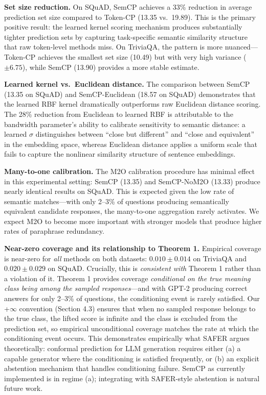 \documentclass{article}
\begin{document}
\label{sec:analysis}

\textbf{Set size reduction.} On SQuAD, SemCP achieves a 33\% reduction in average prediction set size compared to Token-CP (13.35 vs.\ 19.89). This is the primary positive result: the learned kernel scoring mechanism produces substantially tighter prediction sets by capturing task-specific semantic similarity structure that raw token-level methods miss. On TriviaQA, the pattern is more nuanced---Token-CP achieves the smallest set size (10.49) but with very high variance ($\pm 6.75$), while SemCP (13.90) provides a more stable estimate.

\textbf{Learned kernel vs.\ Euclidean distance.} The comparison between SemCP (13.35 on SQuAD) and SemCP-Euclidean (18.57 on SQuAD) demonstrates that the learned RBF kernel dramatically outperforms raw Euclidean distance scoring. The 28\% reduction from Euclidean to learned RBF is attributable to the bandwidth parameter's ability to calibrate sensitivity to semantic distance: a learned $\sigma$ distinguishes between ``close but different'' and ``close and equivalent'' in the embedding space, whereas Euclidean distance applies a uniform scale that fails to capture the nonlinear similarity structure of sentence embeddings.

\textbf{Many-to-one calibration.} The M2O calibration procedure has minimal effect in this experimental setting: SemCP (13.35) and SemCP-NoM2O (13.33) produce nearly identical results on SQuAD. This is expected given the low rate of semantic matches---with only 2--3\% of questions producing semantically equivalent candidate responses, the many-to-one aggregation rarely activates. We expect M2O to become more important with stronger models that produce higher rates of paraphrase redundancy.

\textbf{Near-zero coverage and its relationship to Theorem 1.} Empirical coverage is near-zero for \emph{all} methods on both datasets: $0.010 \pm 0.014$ on TriviaQA and $0.020 \pm 0.029$ on SQuAD. Crucially, this is \emph{consistent with} Theorem 1 rather than a violation of it. Theorem 1 provides coverage \emph{conditional on the true meaning class being among the sampled responses}---and with GPT-2 producing correct answers for only 2--3\% of questions, the conditioning event is rarely satisfied. Our +$\infty$ convention (Section 4.3) ensures that when no sampled response belongs to the true class, the lifted score is infinite and the class is excluded from the prediction set, so empirical unconditional coverage matches the rate at which the conditioning event occurs. This demonstrates empirically what SAFER \cite{kumar2025safer} argues theoretically: conformal prediction for LLM generation requires either (a) a capable generator where the conditioning is satisfied frequently, or (b) an explicit abstention mechanism that handles conditioning failure. SemCP as currently implemented is in regime (a); integrating with SAFER-style abstention is natural future work.
\end{document}
